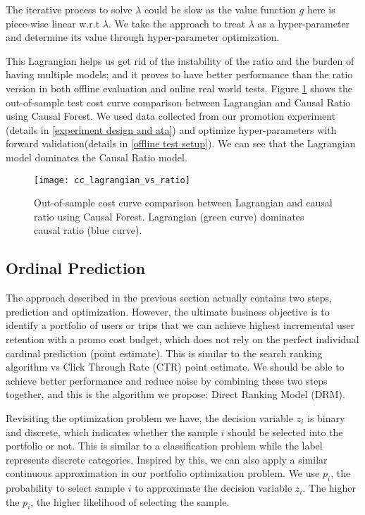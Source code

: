 The iterative process to solve $\lambda$ could be slow as the value function $g$ here is piece-wise linear w.r.t $\lambda$. We take the approach to treat $\lambda$ as a hyper-parameter and determine its value through hyper-parameter optimization. 

This Lagrangian helps us get rid of the instability of the ratio and the burden of having multiple models; and it proves to have better performance than the ratio version in both offline evaluation and online real world tests. Figure \ref{fig:cc_lagrangian_vs_ratio} shows the out-of-sample test cost curve comparison between Lagrangian and Causal Ratio using Causal Forest. We used data collected from our promotion experiment (details in \ref{experiment design and ata}) and optimize hyper-parameters with forward validation(details in \ref{offline test setup}). We can see that the Lagrangian model dominates the Causal Ratio model.
\begin{figure}
\texttt{[image: cc\_lagrangian\_vs\_ratio]}
\caption{Out-of-sample cost curve comparison between Lagrangian and causal ratio using Causal Forest. Lagrangian (green curve) dominates causal ratio (blue curve).}
\label{fig:cc_lagrangian_vs_ratio}
\end{figure}

\subsection{Ordinal Prediction}
The approach described in the previous section actually contains two steps, prediction and optimization. However, the ultimate business objective is to identify a portfolio of users or trips that we can achieve highest incremental user retention with a promo cost budget, which does not rely on the perfect individual cardinal prediction (point estimate). This is similar to the search ranking algorithm vs Click Through Rate (CTR) point estimate. We should be able to achieve better performance and reduce noise by combining these two steps together, and this is the algorithm we propose: Direct Ranking Model (DRM).

Revisiting the optimization problem we have, the decision variable $z_i$ is binary and discrete, which indicates whether the sample $i$ should be selected into the portfolio or not. This is similar to a classification problem while the label represents discrete categories. Inspired by this, we can also apply a similar continuous approximation in our portfolio optimization problem. We use $p_i$, the probability to select sample $i$ to approximate the decision variable $z_i$. The higher the $p_i$, the higher likelihood of selecting the sample.

